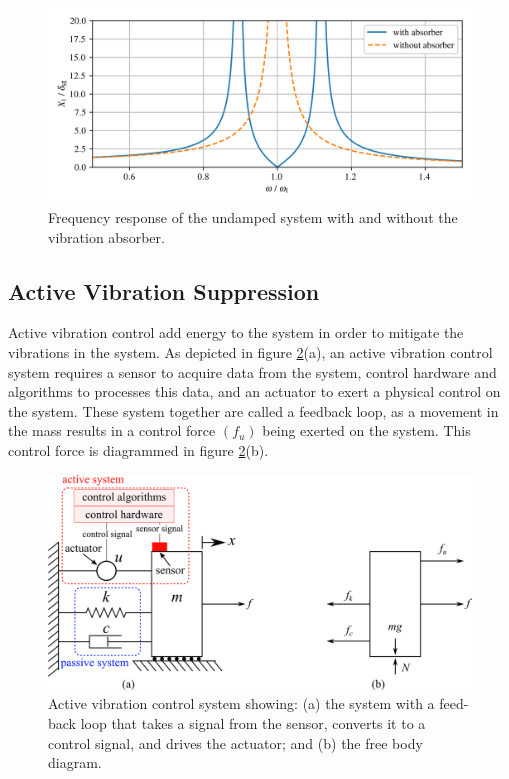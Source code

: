 \documentclass[12pt,letter]{article}
\numberwithin{ex}{section} %
\numberwithin{re}{section} %
\begin{document}
\begin{figure}[H]
    \centering
    \includegraphics[width=6.5in]{../Figures/vibration_absorber_undamped_results.png}
    \caption{Frequency response of the undamped system with and without the vibration absorber.}
    \label{fig:vibration_absorber_undamped_results}
\end{figure}







\subsection{Active Vibration Suppression}

Active vibration control add energy to the system in order to mitigate the vibrations in the system. As depicted in figure \ref{fig:active_vibration_control_FBD}(a), an active vibration control system requires a sensor to acquire data from the system, control hardware and algorithms to processes this data, and an actuator to exert a physical control on the system. These system together are called a feedback loop, as a movement in the mass results in a control force $(f_u)$ being exerted on the system. This control force is diagrammed in figure \ref{fig:active_vibration_control_FBD}(b). 

\begin{figure}[H]
    \centering
    \includegraphics[width=5in]{../Figures/active_vibration_control_FBD.png}
    \caption{Active vibration control system showing: (a) the system with a feed-back loop that takes a signal from the sensor, converts it to a control signal, and drives the actuator; and (b) the free body diagram.}
    \label{fig:active_vibration_control_FBD}
\end{figure}
\end{document}
